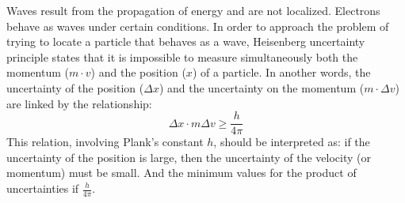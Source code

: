 \documentclass[main.tex]{subfiles}
\newcommand\chapterlabel{electrons}
\begin{document}
\begin{description}
\begin{center}
   \end{center}
   
   

\item[\docfilehook{The uncertainty principle}{}] 
Waves result from the propagation of energy and are not localized. Electrons behave as waves under certain conditions. In order to approach the problem of trying to locate a particle that behaves as a wave, Heisenberg uncertainty principle states that it is impossible to measure simultaneously both the momentum ($m\cdot v$) and the position ($x$) of a particle. In another words, the uncertainty of the position ($\Delta x$) and the uncertainty on the momentum ($m\cdot \Delta v$) are linked by the relationship:
\begin{equation}
\Delta x\cdot m\Delta v \geq \frac{h}{4\pi} 
\end{equation}
This relation, involving Plank's constant $h$, should be interpreted as: if the uncertainty of the position is large, then the uncertainty of the velocity (or momentum) must be small. And the minimum values for the product of uncertainties if $\frac{h}{4\pi} $. 



\end{description}
\end{document}

